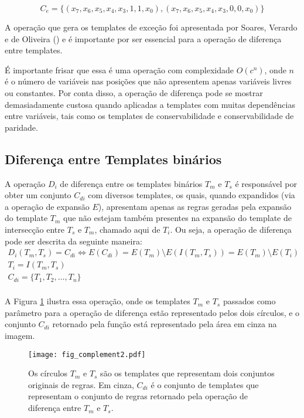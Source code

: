 \begin{equation}
C_e = \{(x_7, x_6, x_5, x_4, x_3, 1, 1, x_0),(x_7, x_6, x_5, x_4, x_3, 0, 0, x_0)\}
\label{eq:exceptionsTemplates2}
\end{equation}

A operação que gera os templates de exceção foi apresentada por Soares, Verardo e
de Oliveira (\citeyear{soares2016difference}) e é importante por ser essencial para a operação de diferença entre templates. 

É importante frisar que essa é uma operação com complexidade $O(c^n)$, onde $n$ é o número de variáveis nas posições que não apresentem apenas variáveis livres ou constantes. Por conta disso, a operação de diferença pode se mostrar demasiadamente custosa quando aplicadas a templates com muitas dependências entre variáveis, tais como os templates de conservabilidade e conservabilidade de paridade.

\subsection{Diferença entre Templates binários}
A operação $D_i$ de diferença entre os templates binários $T_m$ e $T_s$ é responsável por obter um conjunto $C_{di}$ com diversos templates, os quais, quando expandidos (via a operação de expansão $E$), apresentam apenas as regras geradas pela expansão do template $T_m$ que não estejam também presentes na expansão do template de intersecção entre $T_s$ e $T_m$, chamado aqui de $T_i$. Ou seja, a operação de diferença pode ser descrita da seguinte maneira:
\begin{equation}
\begin{split}
D_i(T_m,T_s)= C_{di} \Leftrightarrow E(C_{di}) = E(T_m) \setminus E(I(T_m, T_s)) = E(T_m) \setminus E(T_i) \\
T_i = I(T_m,T_s)\\
C_{di} = \{T_1,T_2,\dots, T_n\}\\
\end{split}
\end{equation}

A Figura \ref{fig:complement} ilustra essa operação, onde os templates $T_m$ e $T_s$ passados como parâmetro para a operação de diferença estão representado pelos dois círculos, e o conjunto $C_{di}$ retornado pela função está representado pela área em cinza na imagem.
\begin{figure}[h!]
  \centering
  \texttt{[image: fig\_complement2.pdf]}
  \caption{Os círculos $T_m$ e $T_s$ são os templates que representam dois conjuntos originais de regras. Em cinza, $C_{di}$ é o conjunto de templates que representam o conjunto de regras retornado pela operação de diferença entre $T_m$ e $T_s$.}
  \label{fig:complement}
\end{figure}    

